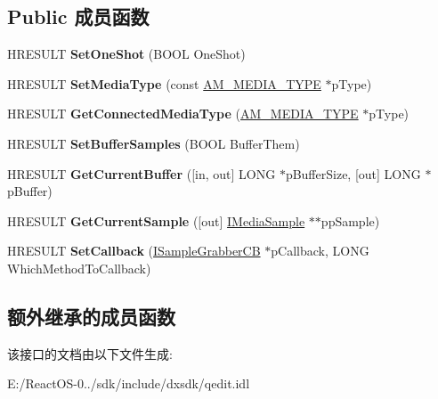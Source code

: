 \subsection*{Public 成员函数}
\begin{DoxyCompactItemize}
\item 
\mbox{\label{interface_i_sample_grabber_a847cc3cf162f56b7934aa55b53986e33}} 
H\+R\+E\+S\+U\+LT {\bfseries Set\+One\+Shot} (B\+O\+OL One\+Shot)
\item 
\mbox{\label{interface_i_sample_grabber_a6c4d0f97c0aa8e4b0cec3a3f2b5e3611}} 
H\+R\+E\+S\+U\+LT {\bfseries Set\+Media\+Type} (const \hyperlink{struct_a_m___m_e_d_i_a___t_y_p_e}{A\+M\+\_\+\+M\+E\+D\+I\+A\+\_\+\+T\+Y\+PE} $\ast$p\+Type)
\item 
\mbox{\label{interface_i_sample_grabber_ae6e4b7ab2320d0f4e037ddd13fdec3e2}} 
H\+R\+E\+S\+U\+LT {\bfseries Get\+Connected\+Media\+Type} (\hyperlink{struct_a_m___m_e_d_i_a___t_y_p_e}{A\+M\+\_\+\+M\+E\+D\+I\+A\+\_\+\+T\+Y\+PE} $\ast$p\+Type)
\item 
\mbox{\label{interface_i_sample_grabber_ab7759d458d91d8773ab44301570f4473}} 
H\+R\+E\+S\+U\+LT {\bfseries Set\+Buffer\+Samples} (B\+O\+OL Buffer\+Them)
\item 
\mbox{\label{interface_i_sample_grabber_a7aa796cea50f15dd5d1de77201b4d878}} 
H\+R\+E\+S\+U\+LT {\bfseries Get\+Current\+Buffer} (\mbox{[}in, out\mbox{]} L\+O\+NG $\ast$p\+Buffer\+Size, \mbox{[}out\mbox{]} L\+O\+NG $\ast$p\+Buffer)
\item 
\mbox{\label{interface_i_sample_grabber_a30bcd4af2f01fb8251c7a951d7f59fa3}} 
H\+R\+E\+S\+U\+LT {\bfseries Get\+Current\+Sample} (\mbox{[}out\mbox{]} \hyperlink{interface_i_media_sample}{I\+Media\+Sample} $\ast$$\ast$pp\+Sample)
\item 
\mbox{\label{interface_i_sample_grabber_a5738c03b4e08a625ab7bbdf0f212f93c}} 
H\+R\+E\+S\+U\+LT {\bfseries Set\+Callback} (\hyperlink{interface_i_sample_grabber_c_b}{I\+Sample\+Grabber\+CB} $\ast$p\+Callback, L\+O\+NG Which\+Method\+To\+Callback)
\end{DoxyCompactItemize}
\subsection*{额外继承的成员函数}


该接口的文档由以下文件生成\+:\begin{DoxyCompactItemize}
\item 
E\+:/\+React\+O\+S-\/0../sdk/include/dxsdk/qedit.\+idl\end{DoxyCompactItemize}

